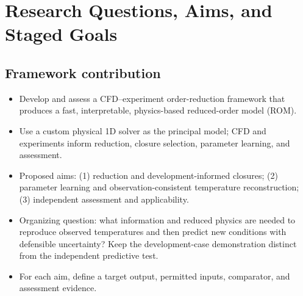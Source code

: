 \section{Research Questions, Aims, and Staged Goals}\label{sec:research-questions-aims-and-staged-goals}

\subsection{Framework contribution}\label{subsec:framework-contribution}
\begin{itemize}[leftmargin=*]
\item Develop and assess a CFD--experiment order-reduction framework that produces a fast, interpretable, physics-based reduced-order model (ROM).
\item Use a custom physical 1D solver as the principal model; CFD and experiments inform reduction, closure selection, parameter learning, and assessment.
\item Proposed aims: (1) reduction and development-informed closures; (2) parameter learning and observation-consistent temperature reconstruction; (3) independent assessment and applicability.
\item Organizing question: what information and reduced physics are needed to reproduce observed temperatures and then predict new conditions with defensible uncertainty? Keep the development-case demonstration distinct from the independent predictive test.
\item For each aim, define a target output, permitted inputs, comparator, and assessment evidence.


\end{itemize}
